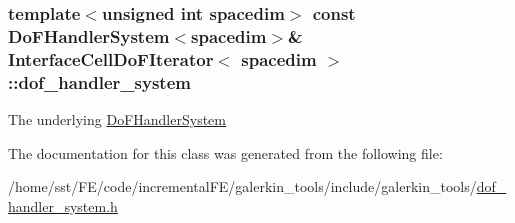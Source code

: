 \subsubsection[{\texorpdfstring{dof\+\_\+handler\+\_\+system}{dof_handler_system}}]{\setlength{\rightskip}{0pt plus 5cm}template$<$unsigned int spacedim$>$ const {\bf Do\+F\+Handler\+System}$<$spacedim$>$\& {\bf Interface\+Cell\+Do\+F\+Iterator}$<$ spacedim $>$\+::dof\+\_\+handler\+\_\+system\hspace{0.3cm}{\ttfamily [private]}}\hypertarget{class_interface_cell_do_f_iterator_a62045b61faee901392a7326b624d2b02}{}\label{class_interface_cell_do_f_iterator_a62045b61faee901392a7326b624d2b02}
The underlying \hyperlink{class_do_f_handler_system}{Do\+F\+Handler\+System} 

The documentation for this class was generated from the following file\+:\begin{DoxyCompactItemize}
\item 
/home/sst/\+F\+E/code/incremental\+F\+E/galerkin\+\_\+tools/include/galerkin\+\_\+tools/\hyperlink{dof__handler__system_8h}{dof\+\_\+handler\+\_\+system.\+h}\end{DoxyCompactItemize}
